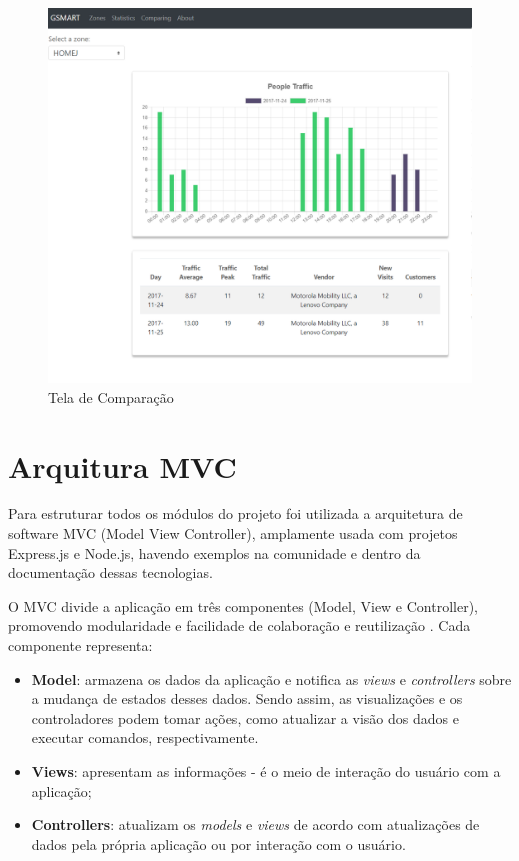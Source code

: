 \begin{figure}[!h]
  \caption{\label{comparing-ap}Tela de Comparação}
  \begin{center}
    \includegraphics[width=1.0\textwidth]{img/comparing.png}
  \end{center}
\end{figure}

\section{Arquitura MVC}
Para estruturar todos os módulos do projeto foi utilizada a arquitetura de
software MVC (Model View Controller), amplamente usada com projetos
Express.js e Node.js, havendo exemplos na comunidade e dentro da documentação dessas
tecnologias.

O MVC divide a aplicação em três componentes (Model, View e Controller),
promovendo modularidade e facilidade de colaboração e reutilização \cite{mdn}. Cada componente representa:

\begin{itemize}
    \item \textbf{Model}: armazena os dados da aplicação e notifica as \emph{views} e
    \emph{controllers} sobre a mudança de estados desses dados. Sendo assim, as visualizações e os controladores
    podem tomar ações, como atualizar a visão dos dados e executar comandos, respectivamente.
    \item \textbf{Views}: apresentam as informações - é o meio de interação do usuário com
    a aplicação;
    \item \textbf{Controllers}: atualizam os \emph{models} e \emph{views} de acordo
    com atualizações de dados pela própria aplicação ou por interação com o usuário.
\end{itemize}

